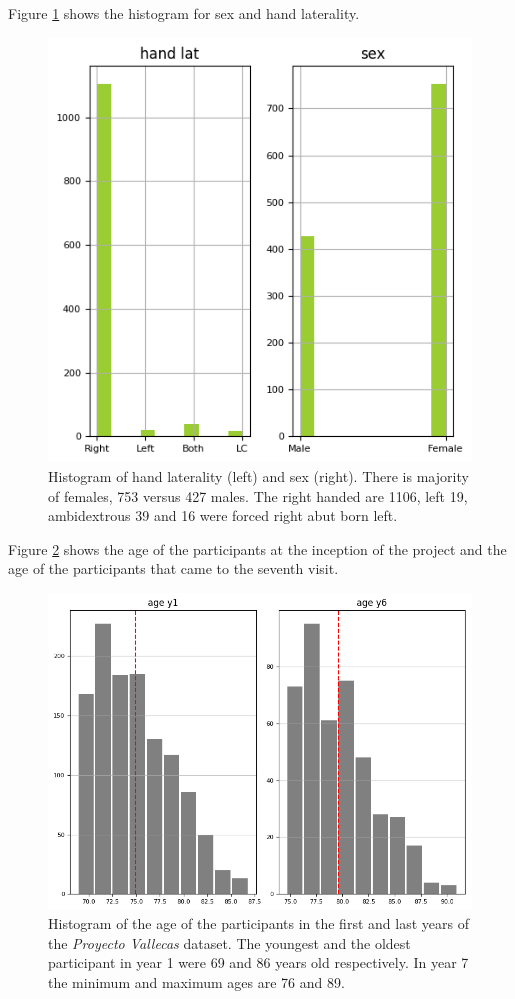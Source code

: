 \documentclass[11pt]{article}
\theoremstyle{definition}
\theoremstyle{remark}
\begin{document}
Figure \ref{fig:sexlat} shows the histogram for sex and hand laterality.
\begin{figure}[H]
        \centering
        \includegraphics[keepaspectratio, width=.4\linewidth]{figures/Fig_sexlat}
        \caption{Histogram of hand laterality (left) and sex (right). There is majority of females, 753 versus 427 males. The right handed are 1106, left 19, ambidextrous 39 and 16 were forced right abut born left.} 
        \label{fig:sexlat}
\end{figure}

Figure \ref{fig:ages} shows the age of the participants at the inception of the project and the age of the participants that came to the seventh visit.

\begin{figure}[H]
        \centering
        \includegraphics[keepaspectratio, width=.6\linewidth]{figures/Fig_ages}
        \caption{Histogram of the age of the participants in the first and last years of the \emph{Proyecto Vallecas} dataset. The youngest and the oldest participant in year 1 were 69 and 86 years old respectively. In year 7 the minimum and maximum ages are 76 and 89.} 
        \label{fig:ages}
\end{figure}

\end{document}
